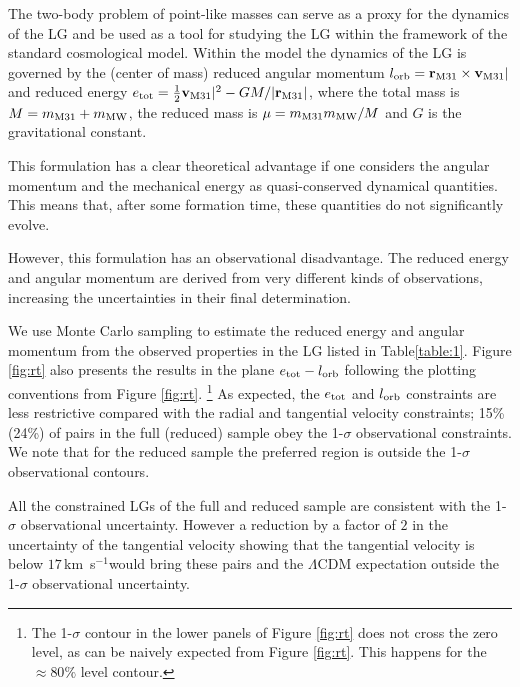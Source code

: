 \documentclass{emulateapj}
\newcommand{\kms}{\,km~s$^{-1}$}
\begin{document}
The two-body problem of point-like masses can serve as a proxy for the
dynamics of the LG and be used as a tool for  studying the LG within
the framework of the standard cosmological model. Within the model the
dynamics of the LG is governed by the (center of mass)  reduced
angular momentum $l_{\rm orb}= {{\bf r}_{\rm M31}}\times{\bf v}_{\rm M31}|$ and
reduced energy  $e_{\rm tot}=\frac{1}{2} {\bf v}_{\rm M31}|^2 - G M/|{\bf
  r}_{\rm M31}|$,  where the total mass is $M=m_{\rm M31}+m_{\rm MW}$,
the reduced mass is $\mu=m_{\rm M31}m_{\rm MW}/M$ and $G$ is the
gravitational constant.  


This formulation has a clear theoretical advantage if one considers
the angular momentum and the mechanical energy as quasi-conserved
dynamical quantities. This means that, after some formation time,
these quantities do not significantly evolve.


However, this formulation has an observational disadvantage. The
reduced energy and angular momentum are derived from very different
kinds of observations, increasing the uncertainties in their final
determination.  

We use Monte Carlo sampling to estimate the reduced energy and angular
momentum from the observed properties in the LG listed in
Table\ref{table:1}. Figure \ref{fig:rt} also presents the results in the
plane $e_{\rm tot}-l_{\rm orb}$ following the   plotting conventions from
Figure \ref{fig:rt}. \footnote{The  1-$\sigma$ contour in the lower
  panels of Figure \ref{fig:rt}
does not cross the zero level, as can be naively expected from Figure
\ref{fig:rt}. This happens for the $\approx 80\%$ level
contour.}  As expected, the $e_{\rm tot}$  and $l_{\rm orb}$
constraints are less restrictive compared with the radial and
tangential velocity constraints; 15\% (24\%) of pairs in the full
(reduced) sample obey the 1-$\sigma$ observational constraints.
We note that for the reduced sample the preferred region is outside the
1-$\sigma$ observational contours.

All the constrained LGs of the full and reduced sample are
consistent with the 1-$\sigma$ observational uncertainty.  However a
reduction by a factor of $2$ in the uncertainty of the tangential
velocity showing that the tangential velocity is below $17$\kms would
bring these pairs and the $\Lambda$CDM expectation outside the
1-$\sigma$ observational uncertainty.  
\end{document}
